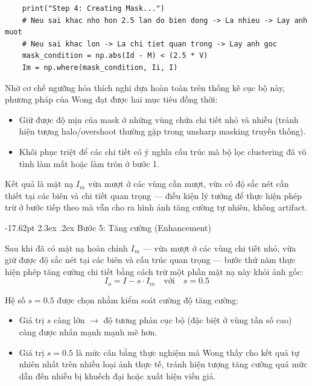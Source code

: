 \documentclass[a4paper]{report}
\makeatletter
\renewcommand\section{\@startsection{section}{1}{\z@}%
    {-17.62pt \@plus -5.89pt \@minus -1.18pt}%
    {2.3ex \@plus .2ex}%
    {\normalfont\fontsize{14.95pt}{16.31pt}\selectfont\bfseries}}%
\makeatother
\begin{document}
\begin{lstlisting}
    print("Step 4: Creating Mask...")
    # Neu sai khac nho hon 2.5 lan do bien dong -> La nhieu -> Lay anh muot
    # Neu sai khac lon -> La chi tiet quan trong -> Lay anh goc
    mask_condition = np.abs(Id - M) < (2.5 * V)
    Im = np.where(mask_condition, Ii, I)
\end{lstlisting}

Nhờ cơ chế ngưỡng hóa thích nghi dựa hoàn toàn trên thống kê cục bộ này, phương
pháp của Wong đạt được hai mục tiêu đồng thời:

\begin{itemize}
    \item Giữ được độ mịn của mask ở những vùng chứa chi tiết nhỏ và nhiễu (tránh
          hiện tượng halo/overshoot thường gặp trong unsharp masking truyền thống).
    \item Khôi phục triệt để các chi tiết có ý nghĩa cấu trúc mà bộ lọc clustering đã vô
          tình làm mất hoặc làm tròn ở bước 1.
\end{itemize}

Kết quả là mặt nạ $I_m$ vừa mượt ở các vùng cần mượt, vừa có độ sắc nét cần thiết
tại các biên và chi tiết quan trọng --- điều kiện lý tưởng để thực hiện phép trừ ở
bước tiếp theo mà vẫn cho ra hình ảnh tăng cường tự nhiên, không artifact.

\section{Bước 5: Tăng cường (Enhancement)}

Sau khi đã có mặt nạ hoàn chỉnh $I_m$ --- vừa mượt ở các vùng chi tiết nhỏ, vừa giữ
được độ sắc nét tại các biên và cấu trúc quan trọng --- bước thứ năm thực hiện
phép tăng cường chi tiết bằng cách trừ một phần mặt nạ này khỏi ảnh gốc:
\[
    I_o = I - s \cdot I_m \quad \text{với} \quad s = 0.5
\]

Hệ số $s = 0.5$ được chọn nhằm kiểm soát cường độ tăng cường:

\begin{itemize}
    \item Giá trị $s$ càng lớn $\rightarrow$ độ tương phản cục bộ (đặc biệt ở vùng tần số cao) càng
          được nhấn mạnh mạnh mẽ hơn.
    \item Giá trị $s = 0.5$ là mức cân bằng thực nghiệm mà Wong thấy cho kết quả tự
          nhiên nhất trên nhiều loại ảnh thực tế, tránh hiện tượng tăng cường quá mức
          dẫn đến nhiễu bị khuếch đại hoặc xuất hiện viền giả.
\end{itemize}
\end{document}
